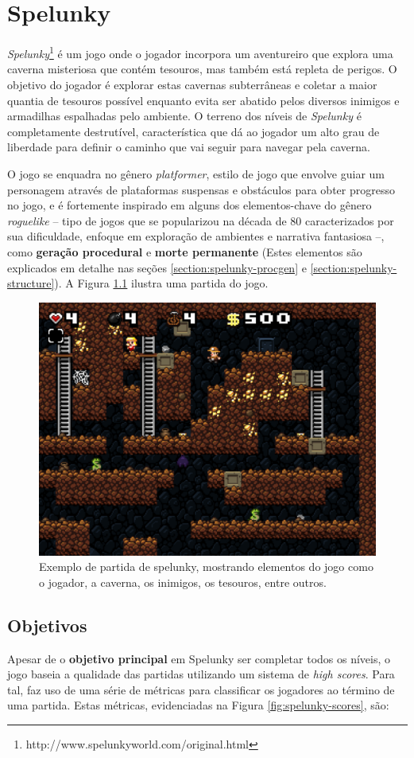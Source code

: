 \chapter{\label{chap:spelunky}Spelunky}
\textit{Spelunky}\footnote{http://www.spelunkyworld.com/original.html} é um jogo
onde o jogador incorpora um aventureiro que explora uma caverna misteriosa que
contém tesouros, mas também está repleta de perigos. O objetivo do jogador é
explorar estas cavernas subterrâneas e coletar a maior quantia de tesouros
possível enquanto evita ser abatido pelos diversos inimigos e armadilhas
espalhadas pelo ambiente. O terreno dos níveis de \textit{Spelunky} é
completamente destrutível, característica que dá ao jogador um alto grau de
liberdade para definir o caminho que vai seguir para navegar pela caverna.

O jogo se enquadra no gênero \textit{platformer}, estilo de jogo que envolve
guiar um personagem através de plataformas suspensas e obstáculos para obter
progresso no jogo, e é fortemente inspirado em alguns dos elementos-chave do
gênero \textit{roguelike} -- tipo de jogos que se popularizou na década de 80
caracterizados por sua dificuldade, enfoque em exploração de ambientes e
narrativa fantasiosa --, como \textbf{geração procedural} e \textbf{morte
permanente} (Estes elementos são explicados em detalhe nas seções
\ref{section:spelunky-procgen} e \ref{section:spelunky-structure}). A Figura
\ref{fig:spelunky-gameplay} ilustra uma partida do jogo.

\begin{figure}[htb!]
\centering
\includegraphics[width=.65\textwidth]{fig/spelunky-pc-screen.pdf}
\caption{\label{fig:spelunky-gameplay}Exemplo de partida de spelunky, mostrando
elementos do jogo como o jogador, a caverna, os inimigos, os tesouros, entre
outros.}
\end{figure}


\section{\label{section:spelunky-goals}Objetivos}
Apesar de o \textbf{objetivo principal} em Spelunky ser completar todos os
níveis, o jogo baseia a qualidade das partidas utilizando um sistema de
\textit{high scores}. Para tal, faz uso de uma série de métricas para
classificar os jogadores ao término de uma partida. Estas métricas, evidenciadas
na Figura \ref{fig:spelunky-scores}, são:

